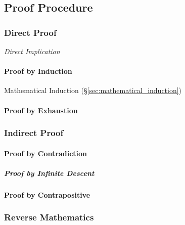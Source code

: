 \subsection{Proof Procedure}\label{sec:proof_procedure}

\subsubsection{Direct Proof}\label{sec:direct_proof}

\emph{Direct Implication}



\paragraph{Proof by Induction}\label{sec:induction_proof}\hfill

Mathematical Induction (\S\ref{sec:mathematical_induction})



\paragraph{Proof by Exhaustion}\label{sec:exhaustion_proof}\hfill



\subsubsection{Indirect Proof}\label{sec:indirect_proof}

\paragraph{Proof by Contradiction}\label{sec:contradiction_proof}\hfill

\subparagraph{Proof by Infinite Descent}\label{sec:infinite_descent}\hfill

\paragraph{Proof by Contrapositive}\label{sec:contrapositive_proof}\hfill



\subsubsection{Reverse Mathematics}\label{sec:reverse_mathematics}



